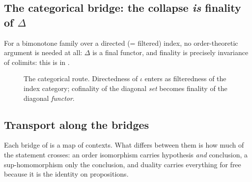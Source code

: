 \subsection{The categorical bridge: the collapse \emph{is} finality of $\Delta$}

For a bimonotone family over a directed (= filtered) index, no order-theoretic argument
is needed at all: $\Delta$ is a final functor, and finality is precisely invariance of
colimits: this is
 in .

\begin{figure}[ht]
\centering
{}
\qquad
{}
\caption{The categorical route.  Directedness of $\iota$ enters as filteredness of the
index category; cofinality of the diagonal \emph{set} becomes finality of the diagonal
\emph{functor}.}
\end{figure}

\subsection{Transport along the bridges}

Each bridge of  is a map of contexts.  What differs between them is
how much of the statement crosses: an order isomorphism carries hypothesis
\emph{and} conclusion, a sup-homomorphism only the conclusion, and duality carries
everything for free because it is the identity on propositions.

